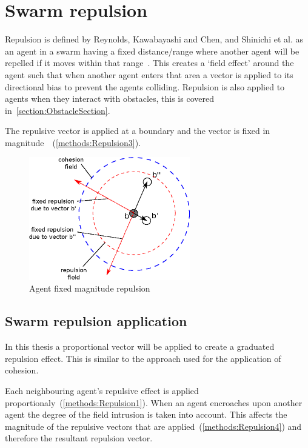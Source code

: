 \section{Swarm repulsion}\label{sec:Repulsion1}
Repulsion is defined by Reynolds, Kawabayashi and Chen, and Shinichi et al. as an agent in a swarm having a fixed distance/range where another agent will be repelled if it moves within that range~\cite{REY:87, KC:08, AYSH:08}. This creates a `field effect' around the agent such that when another agent enters that area a vector is applied to its directional bias to prevent the agents colliding. Repulsion is also applied to agents when they interact with obstacles, this is covered in~\autoref{section:ObstacleSection}.

The repulsive vector is applied at a boundary and the vector is fixed in magnitude~\cite{KC:08, REY:87, AYSH:08}~(\autoref{methods:Repulsion3}). 

\begin{figure}[H]
\begin{center}
\includegraphics[width=7cm]{CHAPTER-2/figures/Repulsion3}
\caption{Agent fixed magnitude repulsion\label{methods:Repulsion3}}
\end{center}
\end{figure}

\subsection{Swarm repulsion application}\label{sec:Repulsion1}
In this thesis a proportional vector will be applied to create a graduated repulsion effect. This is similar to the approach used for the application of cohesion. 

Each neighbouring agent's repulsive effect is applied proportionaly~(\autoref{methods:Repulsion1}). When an agent encroaches upon another agent the degree of the field intrusion is taken into account. This affects the magnitude of the repulsive vectors that are applied~(\autoref{methods:Repulsion4}) and therefore the resultant repulsion vector. 

